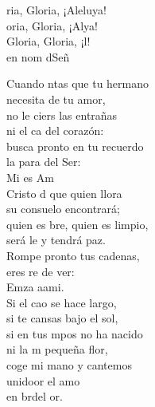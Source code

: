 \begin{cancion}%
	\begin{chorus}%
	ria, Gloria, ¡Aleluya!\\
	oria, Gloria, ¡Alya!\\
	Gloria, Gloria, ¡l!\\
	en nom dSeñ \\
	\end{chorus}%
	Cuando ntas que tu hermano\\
necesita de tu amor,\\
	no le ciers las entrañas\\
	ni el ca del corazón:\\
busca pronto en tu recuerdo\\
	la para del Ser:\\
	Mi  es  Am\\
	Cristo d que quien llora\\
su consuelo encontrará;\\
	quien es bre, quien es limpio,\\
	será le y tendrá paz.\\
Rompe pronto tus cadenas,\\
	eres re de ver:\\
	Emza aami.\\
	Si el cao se hace largo,\\
si te cansas bajo el sol,\\
	si en tus mpos no ha nacido\\
	ni la m pequeña flor,\\
coge mi mano y cantemos\\
	unidoor el amo\\
	en brdel or. \\
\end{cancion}%
